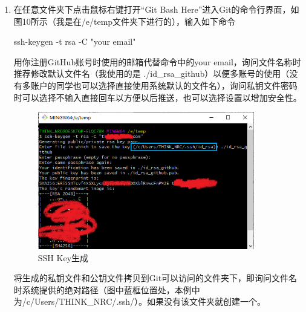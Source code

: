 \documentclass[a4paper,14pt]{article}
\begin{document}
\begin{enumerate}[1. ]
\item 在任意文件夹下点击鼠标右键打开“Git Bash Here”进入Git的命令行界面，如图10所示（我是在/e/temp文件夹下进行的），输入如下命令

ssh-keygen -t rsa -C "your email"

用你注册GitHub账号时使用的邮箱代替命令中的your email，询问文件名称时推荐修改默认文件名（我使用的是 ./id\_rsa\_github）以便多账号的使用（没有多账户的同学也可以选择直接使用系统默认的文件名），询问私钥文件密码时可以选择不输入直接回车以方便以后推送，也可以选择设置以增加安全性。
\begin{figure}[h]
\centering
\includegraphics[height=6cm]{figure/sshkey}
\caption{SSH Key生成}
\end{figure}

将生成的私钥文件和公钥文件拷贝到Git可以访问的文件夹下，即询问文件名时系统提供的绝对路径（图中蓝框位置处，本例中为/c/Users/THINK\_NRC/.ssh/）。如果没有该文件夹就创建一个。

\newpage

\quad

\quad

\quad


\end{enumerate}
\end{document}
